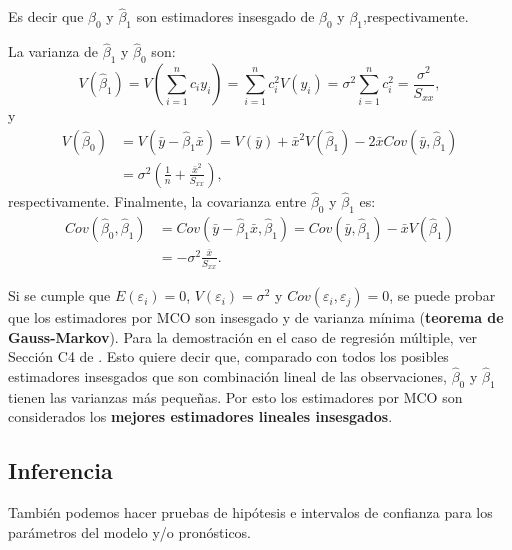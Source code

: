 \documentclass[
]{article}
\begin{document}
Es decir que \(\widehat{\beta}_{0}\) y \(\widehat{\beta}_{1}\) son estimadores insesgado de \(\beta_{0}\) y \(\beta_{1}\),respectivamente.

La varianza de \(\widehat{\beta}_{1}\) y \(\widehat{\beta}_{0}\) son:
\[
V(\widehat{\beta}_{1})= V \left( \sum_{i=1}^{n}c_{i}y_{i}\right) = \sum_{i=1}^{n}c_{i}^{2}V(y_{i}) = \sigma^{2}\sum_{i=1}^{n}c_{i}^{2} = \frac{\sigma^{2}}{S_{xx}},
\]
y
\begin{equation}
\begin{split}
V(\widehat{\beta}_{0}) &= V \left( \bar{y} - \widehat{\beta}_{1}\bar{x}\right) = V (\bar{y}) + \bar{x}^{2}V(\widehat{\beta}_{1}) - 2\bar{x}Cov(\bar{y},\widehat{\beta}_{1}) \\
&= \sigma^{2} \left(\frac{1}{n} + \frac{\bar{x}^{2}}{S_{xx}} \right),
\end{split}
\nonumber
\end{equation}
respectivamente. Finalmente, la covarianza entre \(\widehat{\beta}_{0}\) y \(\widehat{\beta}_{1}\) es:
\begin{equation}
\begin{split}
Cov(\widehat{\beta}_{0},\widehat{\beta}_{1}) &= Cov\left(\bar{y} - \widehat{\beta}_{1}\bar{x}, \widehat{\beta}_{1} \right) = Cov\left( \bar{y}, \widehat{\beta}_{1}\right) - \bar{x}V\left(\widehat{\beta}_{1}\right) \\
&=  - \sigma^{2}\frac{\bar{x}}{S_{xx}}.
\end{split}
\nonumber
\end{equation}

Si se cumple que \(E(\varepsilon_{i}) = 0\), \(V(\varepsilon_{i}) = \sigma^{2}\) y \(Cov(\varepsilon_{i},\varepsilon_{j})=0\), se puede probar que los estimadores por MCO son insesgado y de varianza mínima (\textbf{teorema de Gauss-Markov}). Para la demostración en el caso de regresión múltiple, ver Sección C4 de \citet{montgomery_introduction_2012}. Esto quiere decir que, comparado con todos los posibles estimadores insesgados que son combinación lineal de las observaciones, \(\widehat{\beta}_{0}\) y \(\widehat{\beta}_{1}\) tienen las varianzas más pequeñas. Por esto los estimadores por MCO son considerados los \textbf{mejores estimadores lineales insesgados}.

\hypertarget{inferencia}{%
\subsection{Inferencia}\label{inferencia}}

También podemos hacer pruebas de hipótesis e intervalos de confianza para los parámetros del modelo y/o pronósticos.
\end{document}
